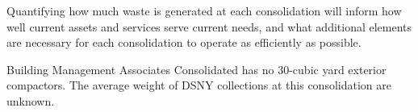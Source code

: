 
    Quantifying how much waste is generated at each consolidation will inform how well current assets and services serve current needs, and what additional elements are necessary for each consolidation to operate as efficiently as possible.
    
    Building Management Associates Consolidated has no 30-cubic yard exterior compactors. The average weight of DSNY collections at this consolidation are unknown.
